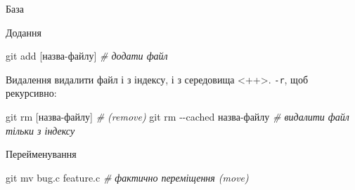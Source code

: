 \documentclass[
  ignorenonframetext,
  aspectratio=169,
]{beamer}
\newenvironment{Shaded}{}{}
\newcommand{\AttributeTok}[1]{\textcolor[rgb]{0.49,0.56,0.16}{#1}}
\newcommand{\CommentTok}[1]{\textcolor[rgb]{0.38,0.63,0.69}{\textit{#1}}}
\newcommand{\FunctionTok}[1]{\textcolor[rgb]{0.02,0.16,0.49}{#1}}
\newcommand{\NormalTok}[1]{#1}
\newcommand{\PreprocessorTok}[1]{\textcolor[rgb]{0.74,0.48,0.00}{#1}}
\newcommand{\SpecialStringTok}[1]{\textcolor[rgb]{0.73,0.40,0.53}{#1}}
\begin{document}
\begin{frame}[fragile]{База}
\protect\hypertarget{ux431ux430ux437ux430}{}
\begin{block}{Додання}
\protect\hypertarget{ux434ux43eux434ux430ux43dux43dux44f}{}
\begin{Shaded}
\begin{Highlighting}[]
\FunctionTok{git}\NormalTok{ add }\PreprocessorTok{[}\SpecialStringTok{назва}\PreprocessorTok{{-}}\SpecialStringTok{файлу}\PreprocessorTok{]}   \CommentTok{\# додати файл}
\end{Highlighting}
\end{Shaded}

\pause
\end{block}

\begin{block}{Видалення}
\protect\hypertarget{ux432ux438ux434ux430ux43bux435ux43dux43dux44f}{}
видалити файл і з індексу, і з середовища \textless++\textgreater.
\texttt{-r}, щоб рекурсивно:

\begin{Shaded}
\begin{Highlighting}[]
\FunctionTok{git}\NormalTok{ rm }\PreprocessorTok{[}\SpecialStringTok{назва}\PreprocessorTok{{-}}\SpecialStringTok{файлу}\PreprocessorTok{]}        \CommentTok{\# (remove)}
\FunctionTok{git}\NormalTok{ rm }\AttributeTok{{-}{-}cached}\NormalTok{ назва{-}файлу }\CommentTok{\# видалити файл тільки з індексу}
\end{Highlighting}
\end{Shaded}

\pause
\end{block}

\begin{block}{Перейменування}
\protect\hypertarget{ux43fux435ux440ux435ux439ux43cux435ux43dux443ux432ux430ux43dux43dux44f}{}
\begin{Shaded}
\begin{Highlighting}[]
\FunctionTok{git}\NormalTok{ mv bug.c feature.c  }\CommentTok{\# фактично переміщення (move)}
\end{Highlighting}
\end{Shaded}
\end{block}
\end{frame}
\end{document}
